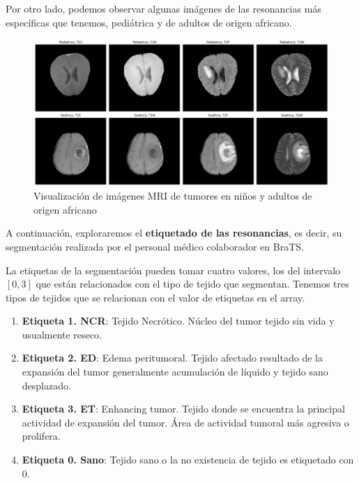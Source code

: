 Por otro lado, podemos observar algunas imágenes de las resonancias más específicas que tenemos, pediátrica y de adultos de origen africano.

\begin{figure}[!h]
	\centering
	\includegraphics[width=1.1\linewidth]{imagenes/imgSSAPEDMRI.png}
	\caption{Visualización de imágenes MRI de tumores en niños y adultos de origen africano}
\end{figure}

\newpage

A continuación, exploraremos el \textbf{etiquetado de las resonancias}, es decir, su segmentación realizada por el personal médico colaborador en BraTS.

La etiquetas de la segmentación pueden tomar cuatro valores, los del intervalo $[0, 3]$ que están relacionados con el tipo de tejido que segmentan. Tenemos tres tipos de tejidos que se relacionan con el valor de etiquetas en el array.

\begin{enumerate}
	\item \textbf{Etiqueta 1. NCR}: Tejido Necrótico. Núcleo del tumor tejido sin vida y usualmente reseco.
	\item \textbf{Etiqueta 2. ED}: Edema peritumoral. Tejido afectado resultado de la expansión del tumor generalmente acumulación de líquido y tejido sano desplazado. 
	\item \textbf{Etiqueta 3. ET}: Enhancing tumor. Tejido donde se encuentra la principal actividad de expansión del tumor. Área de actividad tumoral más agresiva o prolifera.
	\item \textbf{Etiqueta 0. Sano}: Tejido sano o la no existencia de tejido es etiquetado con $0$.
\end{enumerate}

